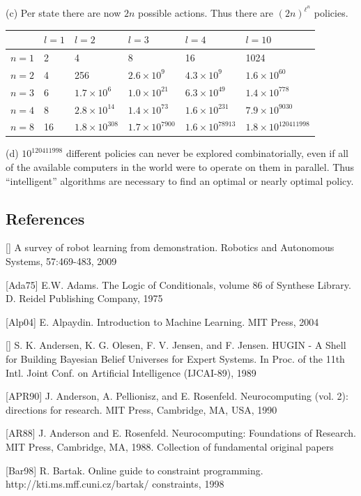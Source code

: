 \documentclass[10pt]{book}
\begin{document}
\begin{center}
(c) Per state there are now $2 n$ possible actions. Thus there are $(2 n)^{\ell^{n}}$ policies.
\begin{tabular}{|l|l|l|l|l|l|}
\hline & $l=1$ & $l=2$ & $l=3$ & $l=4$ & $l=10$ \\
\hline $n=1$ & 2 & 4 & 8 & 16 & 1024 \\
\hline $n=2$ & 4 & 256 & $2.6 \times 10^{9}$ & $4.3 \times 10^{9}$ & $1.6 \times 10^{60}$ \\
\hline $n=3$ & 6 & $1.7 \times 10^{6}$ & $1.0 \times 10^{21}$ & $6.3 \times 10^{49}$ & $1.4 \times 10^{778}$ \\
\hline $n=4$ & 8 & $2.8 \times 10^{14}$ & $1.4 \times 10^{73}$ & $1.6 \times 10^{231}$ & $7.9 \times 10^{9030}$ \\
\hline $n=8$ & 16 & $1.8 \times 10^{308}$ & $1.7 \times 10^{7900}$ & $1.6 \times 10^{78913}$ & $1.8 \times 10^{120411998}$ \\
\hline
\end{tabular}

(d) $10^{120411998}$ different policies can never be explored combinatorially, even if all of the available computers in the world were to operate on them in parallel. Thus ``intelligent'' algorithms are necessary to find an optimal or nearly optimal policy.

\subsection{References}
[\cite{acm09}] A survey of robot learning from demonstration. Robotics and Autonomous Systems, 57:469-483, 2009

[Ada75] E.W. Adams. The Logic of Conditionals, volume 86 of Synthese Library. D. Reidel Publishing Company, 1975

[Alp04] E. Alpaydin. Introduction to Machine Learning. MIT Press, 2004

[\cite{aojj89}] S. K. Andersen, K. G. Olesen, F. V. Jensen, and F. Jensen. HUGIN - A Shell for Building Bayesian Belief Universes for Expert Systems. In Proc. of the 11th Intl. Joint Conf. on Artificial Intelligence (IJCAI-89), 1989

[APR90] J. Anderson, A. Pellionisz, and E. Rosenfeld. Neurocomputing (vol. 2): directions for research. MIT Press, Cambridge, MA, USA, 1990

[AR88] J. Anderson and E. Rosenfeld. Neurocomputing: Foundations of Research. MIT Press, Cambridge, MA, 1988. Collection of fundamental original papers

[Bar98] R. Bartak. Online guide to constraint programming. http://kti.ms.mff.cuni.cz/bartak/ constraints, 1998


\end{center}
\end{document}

